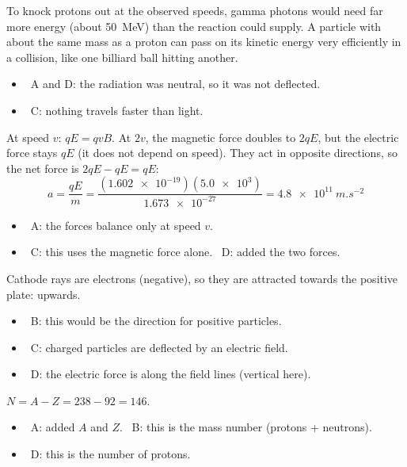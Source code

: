 \documentclass[12pt]{article}
\begin{document}
\begin{practiceanswers}
\begin{practiceans}
  To knock protons out at the observed speeds, gamma photons would need far more energy (about
  \qty{50}{MeV}) than the reaction could supply. A particle with about the same mass as a proton can pass
  on its kinetic energy very efficiently in a collision, like one billiard ball hitting another.
  \begin{itemize}
    \item \xmark\ A and D: the radiation was neutral, so it was not deflected.
    \item \xmark\ C: nothing travels faster than light.
  \end{itemize}
\end{practiceans}

\begin{practiceans}
  At speed $v$: $qE = qvB$. At $2v$, the magnetic force doubles to $2qE$, but the electric force stays $qE$
  (it does not depend on speed). They act in opposite directions, so the net force is $2qE - qE = qE$:
  \[ a = \frac{qE}{m} = \frac{(\num{1.602e-19})(\num{5.0e3})}{\num{1.673e-27}} = \qty{4.8e11}{m.s^{-2}} \]
  \begin{itemize}
    \item \xmark\ A: the forces balance only at speed $v$.
    \item \xmark\ C: this uses the magnetic force alone. \quad \xmark\ D: added the two forces.
  \end{itemize}
\end{practiceans}

\begin{practiceans}
  Cathode rays are electrons (negative), so they are attracted towards the positive plate: upwards.
  \begin{itemize}
    \item \xmark\ B: this would be the direction for positive particles.
    \item \xmark\ C: charged particles are deflected by an electric field.
    \item \xmark\ D: the electric force is along the field lines (vertical here).
  \end{itemize}
\end{practiceans}

\begin{practiceans}
  $N = A - Z = 238 - 92 = 146$.
  \begin{itemize}
    \item \xmark\ A: added $A$ and $Z$. \quad \xmark\ B: this is the mass number (protons + neutrons).
    \item \xmark\ D: this is the number of protons.
  \end{itemize}
\end{practiceans}


\end{practiceanswers}
\end{document}
